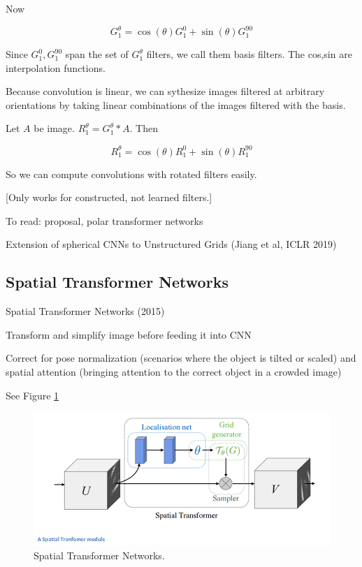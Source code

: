 \documentclass[english]{article}
\begin{document}
Now 

$$G_1^{\theta} = \cos(\theta) G_1^0 + \sin(\theta) G_1^{90} $$

Since $G_1^0, G_1^{90}$ span the set of $G_1^{\theta}$ filters, we call them basis filters. The cos,sin are interpolation functions.

Because convolution is linear, we can sythesize images filtered at arbitrary orientations by taking linear combinations of the images filtered with the basis. 

Let $A$ be image. $R_1^{\theta} = G_1^{\theta}*A$. Then 

$$R_1^{\theta} = \cos(\theta) R_1^0 + \sin(\theta) R_1^{90} $$

So we can compute convolutions with rotated filters easily.

[Only works for constructed, not learned filters.]

\item To read: proposal, polar transformer networks

\item Extension of spherical CNNs to Unstructured Grids (Jiang et al, ICLR 2019)

\eitem 

\subsection{Spatial Transformer Networks}
\benum
\item Spatial Transformer Networks  (2015)

Transform and simplify image before feeding it into CNN

Correct for pose normalization (scenarios where the object is tilted or scaled) and spatial attention (bringing attention to the correct object in a crowded image)

 See Figure \ref{STN}

\begin{figure}
  \centering
  \includegraphics[scale=0.4]{SpatialTransformer}
  \caption{Spatial Transformer Networks.}
  \label{STN}
\end{figure}
\end{document}
